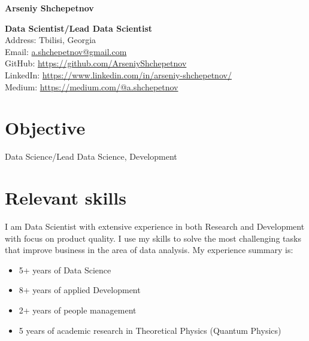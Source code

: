 \documentclass[10pt,a4paper]{article}
\newcommand{\vacancyName}{PhD student}
\begin{document}
	

	\raggedright{\Large{\textbf{Arseniy Shchepetnov}}}\\[0.3cm]
	
	\begin{minipage}[t]{0.7\textwidth}
		\vspace{0pt}
		\raggedright{\textbf{Data Scientist/Lead Data Scientist}}\\[0.3cm]
		\noindent Address: Tbilisi, Georgia \\[0.1cm]
		\noindent Email: \href{mailto:a.shchepetnov@gmail.com}{a.shchepetnov@gmail.com}\\[0.1cm]
		\noindent GitHub: \href{https://github.com/ArseniyShchepetnov}{https://github.com/ArseniyShchepetnov}\\
            \noindent LinkedIn: \href{https://www.linkedin.com/in/arseniy-shchepetnov/}{https://www.linkedin.com/in/arseniy-shchepetnov/}\\
            \noindent Medium: \href{https://medium.com/@a.shchepetnov}{https://medium.com/@a.shchepetnov}
	\end{minipage}
	\begin{minipage}[t]{0.2\textwidth}
		\vspace{0pt}
	\end{minipage}
	
	
	\section*{Objective}
	
	Data Science/Lead Data Science, Development
	
	\section*{Relevant skills}
	
	\setlength{\parindent}{3em}

	
I am Data Scientist with extensive experience in both Research and Development with focus on product quality.
I use my skills to solve the most challenging tasks that improve business in the area of data analysis.
My experience summary is:
\begin{itemize}
    \item 5+ years of Data Science
    \item 8+ years of applied Development
    \item 2+ years of people management
    \item 5 years of academic research in Theoretical Physics (Quantum Physics) 
\end{itemize}
\end{document}
